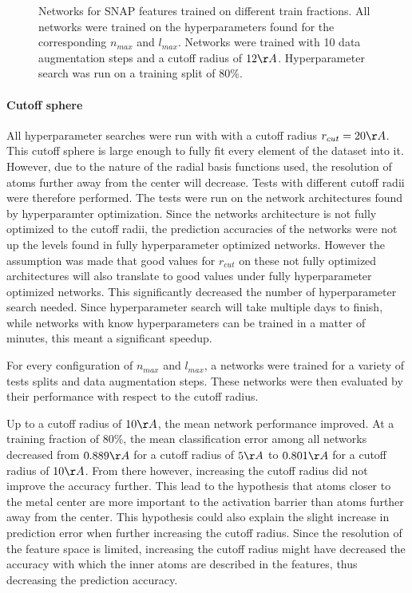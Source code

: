 \begin{figure}[!htb]
  \endminipage
  \caption{
  Networks for SNAP features trained on different train fractions.
  All networks were trained on the hyperparameters found for the corresponding $n_{max}$ and $l_{max}$.
  Networks were trained with 10 data augmentation steps and a cutoff radius of $12 \AA$.
  Hyperparameter search was run on a training split of 80\%.
  }
  \label{fig:snap_hyperparameter}
\end{figure}

\paragraph{Cutoff sphere}
All hyperparameter searches were run with with a cutoff radius $r_{cut} = 20 \AA$.
This cutoff sphere is large enough to fully fit every element of the dataset into it.
However, due to the nature of the radial basis functions used, the resolution of atoms 
further away from the center will decrease.
Tests with different cutoff radii were therefore performed.
The tests were run on the network architectures found by hyperparamter optimization.
Since the networks architecture is not fully optimized to the cutoff radii, the prediction accuracies
of the networks were not up the levels found in fully hyperparameter optimized networks.
However the assumption was made that good values for $r_{cut}$ on these not fully optimized architectures 
will also translate to good values under fully hyperparameter optimized networks.
This significantly decreased the number of hyperparameter search needed.
Since hyperparameter search will take multiple days to finish, while networks with know hyperparameters
can be trained in a matter of minutes, this meant a significant speedup.


For every configuration of $n_{max}$ and $l_{max}$, a networks were trained for a variety 
of tests splits and data augmentation steps.
These networks were then evaluated by their performance with respect to the cutoff radius.

Up to a cutoff radius of $10 \AA$, the mean network performance improved. %
At a training fraction of 80\%, the mean classification error among 
all networks decreased from $0.889 \AA$ for a cutoff radius of $5 \AA$ to 
$0.801 \AA$ for a cutoff radius of $10 \AA$.
From there however, increasing the cutoff radius did not improve the accuracy further.
This lead to the hypothesis that atoms closer to the metal center are more important to the activation barrier than atoms further away from the center.
This hypothesis could also explain the slight increase in prediction error when further increasing the cutoff radius.
Since the resolution of the feature space is limited, increasing the cutoff radius might have decreased the accuracy 
with which the inner atoms are described in the features, thus decreasing the prediction accuracy.

